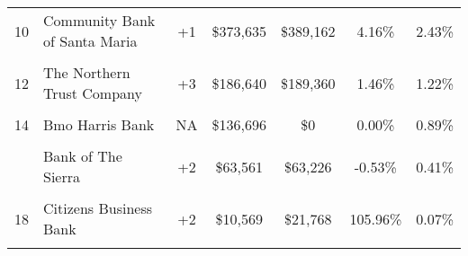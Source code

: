 \begin{table}
\begin{tabular}{llccccc}
10 & Community Bank of Santa Maria & +1 & \$373,635 & \$389,162 & 4.16\% & 2.43\%\\
\addlinespace
\cellcolor{gray!10}{11} & \cellcolor{gray!10}{Pacific Western Bank} & \cellcolor{gray!10}{+2} & \cellcolor{gray!10}{\$261,871} & \cellcolor{gray!10}{\$234,692} & \cellcolor{gray!10}{-10.38\%} & \cellcolor{gray!10}{1.71\%}\\
12 & The Northern Trust Company & +3 & \$186,640 & \$189,360 & 1.46\% & 1.22\%\\
\cellcolor{gray!10}{13} & \cellcolor{gray!10}{First Bank} & \cellcolor{gray!10}{+1} & \cellcolor{gray!10}{\$152,040} & \cellcolor{gray!10}{\$193,217} & \cellcolor{gray!10}{27.08\%} & \cellcolor{gray!10}{0.99\%}\\
14 & Bmo Harris Bank & NA & \$136,696 & \$0 & 0.00\% & 0.89\%\\
\cellcolor{gray!10}{15} & \cellcolor{gray!10}{Farmers and Merchants Bank of Long Beach} & \cellcolor{gray!10}{+1} & \cellcolor{gray!10}{\$103,947} & \cellcolor{gray!10}{\$71,073} & \cellcolor{gray!10}{-31.63\%} & \cellcolor{gray!10}{0.68\%}\\
\addlinespace
16 & Bank of The Sierra & +2 & \$63,561 & \$63,226 & -0.53\% & 0.41\%\\
\cellcolor{gray!10}{17} & \cellcolor{gray!10}{Banc of California} & \cellcolor{gray!10}{+2} & \cellcolor{gray!10}{\$40,387} & \cellcolor{gray!10}{\$50,684} & \cellcolor{gray!10}{25.50\%} & \cellcolor{gray!10}{0.26\%}\\
18 & Citizens Business Bank & +2 & \$10,569 & \$21,768 & 105.96\% & 0.07\%\\
\cellcolor{gray!10}{Totals} & \cellcolor{gray!10}{} & \cellcolor{gray!10}{} & \cellcolor{gray!10}{\$15,354,019} & \cellcolor{gray!10}{\$14,678,086} & \cellcolor{gray!10}{5.79\%} & \cellcolor{gray!10}{100.0\%}\\
\bottomrule
\end{tabular}
\end{table}
